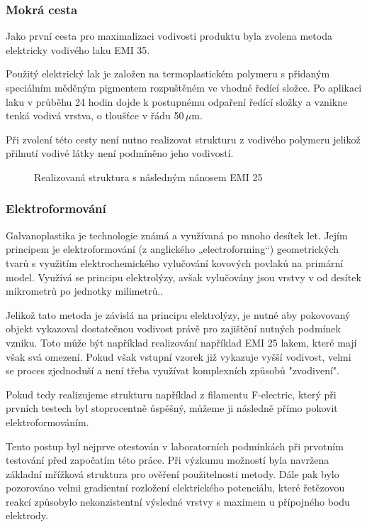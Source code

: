 \subsubsection{Mokrá cesta}
Jako první cesta pro maximalizaci vodivosti produktu byla zvolena metoda elektricky vodivého laku EMI 35\cite{EMIdata}.

Použitý elektrický lak je založen na termoplastickém polymeru s přidaným speciálním měděným pigmentem rozpuštěném ve vhodné ředící složce. Po aplikaci laku v průběhu 24 hodin dojde k postupnému odpaření ředící složky a vznikne tenká vodivá vrstva, o tloušťce v řádu 50\,$\mu$m.

Při zvolení této cesty není nutno realizovat strukturu z vodivého polymeru jelikož přilnutí vodivé látky není podmíněno jeho vodivostí.


\begin{figure}[h]
\begin{center}
\caption{Realizovaná struktura s následným nánosem EMI 25}
\label{fig:HornEMI}
\end{center}
\end{figure}

\subsubsection{Elektroformování}
Galvanoplastika je technologie známá a využívaná po mnoho desítek let. Jejím principem je elektroformování (z anglického „electroforming“) geometrických tvarů s využitím elektrochemického vylučování kovových povlaků na primární model. Využívá se principu elektrolýzy, avšak vylučovány jsou vrstvy v od desítek mikrometrů po jednotky milimetrů.\cite{Electroforming}.

Jelikož tato metoda je závislá na principu elektrolýzy, je nutné aby pokovovaný objekt vykazoval dostatečnou vodivost právě pro zajištění nutných podmínek vzniku. Toto může být například realizování například EMI 25 lakem, které mají však svá omezení. Pokud však vstupní vzorek již vykazuje vyšší vodivost, velmi se proces zjednoduší a není třeba využívat komplexních způsobů "zvodivení".

Pokud tedy realizujeme strukturu například z filamentu F-electric, který při prvních testech byl stoprocentně úspěšný, můžeme ji následně přímo pokovit elektroformováním.

Tento postup byl nejprve otestován v laboratorních podmínkách při prvotním testování před započatím této práce. Při výzkumu možností byla navržena základní mřížková struktura pro ověření použitelnosti metody. Dále pak bylo pozorováno velmi gradientní rozložení elektrického potenciálu, které řetězovou reakcí způsobylo nekonzistentní výsledné vrstvy s maximem u přípojného bodu elektrody.

